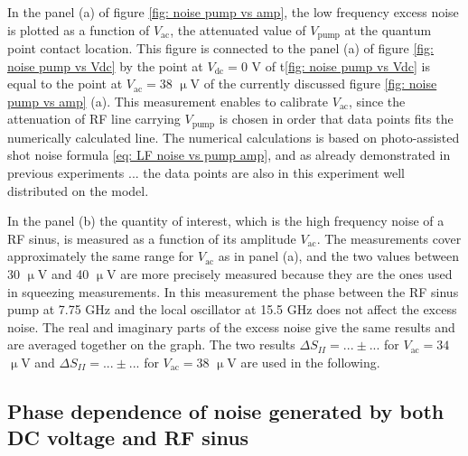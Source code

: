 In the panel (a) of figure \ref{fig: noise pump vs amp}, the low frequency excess noise is plotted as a function of $V_{\mathrm{ac}}$, the attenuated value of $V_{\mathrm{pump}}$ at the quantum point contact location.
This figure is connected to the panel (a) of figure \ref{fig: noise pump vs Vdc} by the point at $V_{\mathrm{dc}} = 0$ V of t\ref{fig: noise pump vs Vdc} is equal to the point at $V_{\mathrm{ac}} = 38$ $\upmu$V of the currently discussed figure \ref{fig: noise pump vs amp} (a).
This measurement enables to calibrate $V_{\mathrm{ac}}$, since the attenuation of RF line carrying $V_{\mathrm{pump}}$ is chosen in order that data points fits the numerically calculated line.
The numerical calculations is based on photo-assisted shot noise formula \ref{eq: LF noise vs pump amp}, and as already demonstrated in previous experiments ... the data points are also in this experiment well distributed on the model.

In the panel (b) the quantity of interest, which is the high frequency noise of a RF sinus, is measured as a function of its amplitude $V_{\mathrm{ac}}$.
The measurements cover approximately the same range for $V_{\mathrm{ac}}$ as in panel (a), and the two values between 30 $\upmu$V and 40 $\upmu$V are more precisely measured because they are the ones used in squeezing measurements. 
In this measurement the phase between the RF sinus pump at 7.75 GHz and the local oscillator at 15.5 GHz does not affect the excess noise.
The real and imaginary parts of the excess noise give the same results and are averaged together on the graph.
The two results $\Delta S_{II} = ... \pm ...$ for $V_{\mathrm{ac}} = 34$ $\upmu$V and $\Delta S_{II} = ... \pm ...$ for $V_{\mathrm{ac}} = 38$ $\upmu$V are used in the following.

\subsection{Phase dependence of noise generated by both DC voltage and RF sinus}

